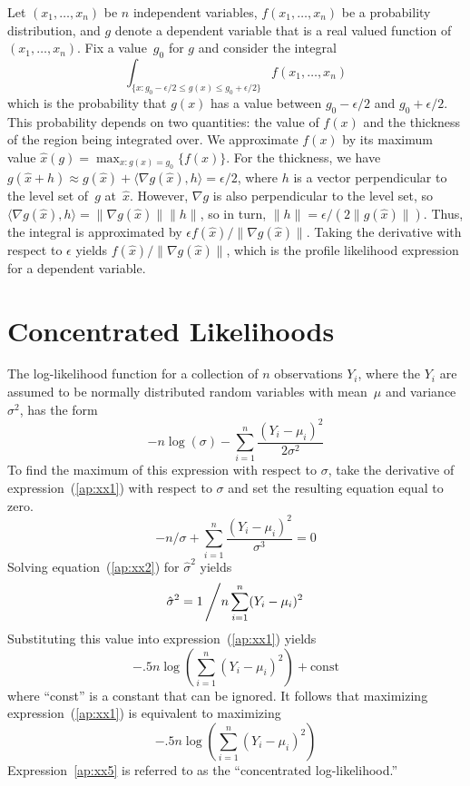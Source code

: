\documentclass{admbmanual}
\begin{document}
Let $(x_1,\ldots,x_n)$ be $n$ independent variables, $f(x_1,\ldots,x_n)$ be a
probability distribution, and $g$ denote a dependent variable that is a real
valued function of $(x_1,\ldots,x_n)$. Fix a value~$g_0$ for $g$ and consider
the integral
$$\int_{\{x:g_0-\epsilon/2\le g(x)\le g_0+\epsilon/2\}} f(x_1,\ldots, x_n)$$
which is the probability that $g(x)$ has a value between $g_0-\epsilon/2$ and
$g_0+\epsilon/2$. This probability depends on two quantities: the value of
$f(x)$ and the thickness of the region being integrated over. We approximate
$f(x)$ by its maximum value $\hat x(g)=\max_{x:g(x)=g_0}\{f(x)\}$. For the
thickness, we have
$g(\hat x+h)\approx g(\hat x)+\langle\nabla g(\hat x),h\rangle=\epsilon/2$,
where $h$ is a vector perpendicular to the level set of~$g$ at~$\hat x$.
However, $\nabla g$ is also perpendicular to the level set, so $\langle\nabla
g(\hat x),h\rangle=\|\nabla g(\hat x)\| \|h\|$, so in turn, $
\|h\|=\epsilon/(2\|g(\hat x)\|)$. Thus, the integral is approximated by
$\epsilon f(\hat x)/\|\nabla g(\hat x)\|$. Taking the derivative with respect to
$\epsilon$ yields $f(\hat x)/\|\nabla g(\hat x)\|$, which is the profile
likelihood expression for a dependent variable.

\chapter{Concentrated Likelihoods}

The log-likelihood function for a collection of $n$ observations $Y_i$, where
the $Y_i$ are assumed to be normally distributed random variables with
mean~$\mu$ and variance~$\sigma^2$, has the form
\begin{equation}
  -n\log(\sigma)-\sum_{i=1}^n \frac{(Y_i-\mu_i)^2}{2\sigma^2}
\label{ap:xx1}
\end{equation}
To find the maximum of this expression with respect to $\sigma$, take the
derivative of expression~(\ref{ap:xx1}) with respect to $\sigma$ and set the
resulting equation equal to zero.
\begin{equation}
  {-n/\sigma+\sum_{i=1}^n \frac{(Y_i-\mu_i)^2}{\sigma^3}=0}\label{ap:xx2}
\end{equation}
Solving equation~(\ref{ap:xx2}) for $\hat\sigma^2$ yields
\begin{equation}
  {\hat\sigma^2=1 \left/  n\sum_{i=1}^n (Y_i-\mu_i)^2 \right.}
\label{ap:xx3}
\end{equation}
Substituting this value into expression~(\ref{ap:xx1}) yields
\begin{equation}
  {-.5n\log \left( \sum_{i=1}^n (Y_i-\mu_i)^2 \right) +\textrm{const}}
  \label{ap:xx4}
\end{equation}
where ``\textrm{const}'' is a constant that can be ignored.
It follows that maximizing expression~(\ref{ap:xx1}) is equivalent to maximizing
\begin{equation}
  {-.5n\log \left( \sum_{i=1}^n (Y_i-\mu_i)^2 \right)}\label{ap:xx5}
\end{equation}
Expression~\ref{ap:xx5} is referred to as the ``concentrated log-likelihood.''
\end{document}
